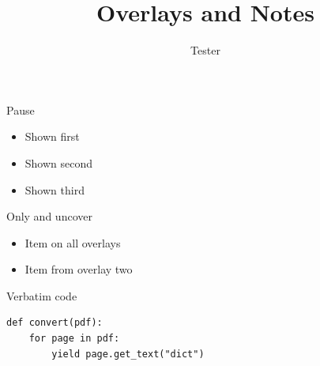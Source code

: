 \documentclass{beamer}
\title{Overlays and Notes}
\author{Tester}
\date{}
\begin{document}
\begin{frame}{Pause}
  \begin{itemize}
    \item Shown first
    \pause
    \item Shown second
    \pause
    \item Shown third
  \end{itemize}
\end{frame}

\begin{frame}{Only and uncover}


  \begin{itemize}
    \item<1-> Item on all overlays
    \item<2-> Item from overlay two
  \end{itemize}
\end{frame}

\begin{frame}[fragile]{Verbatim code}
\begin{verbatim}
def convert(pdf):
    for page in pdf:
        yield page.get_text("dict")
\end{verbatim}
\end{frame}
\end{document}
